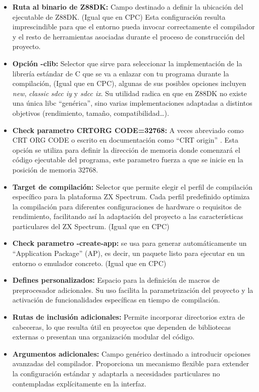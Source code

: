 \documentclass[../main.tex]{subfiles}
\begin{document}
\begin{itemize}
    \item \textbf{Ruta al binario de Z88DK:} Campo destinado a definir la ubicación del ejecutable de Z88DK. (Igual que en CPC) Esta configuración resulta imprescindible para que el entorno pueda invocar correctamente el compilador y el resto de herramientas asociadas durante el proceso de construcción del proyecto.

    \item \textbf{Opción -clib:} Selector que sirve para seleccionar la implementación de la librería estándar de C que se va a enlazar con tu programa durante la compilación, (Igual que en CPC), algunas de sus posibles opciones incluyen \textit{new}, \textit{classic} \textit{sdcc iy} y \textit{sdcc ix}. Su utilidad radica en que en Z88DK no existe una única libc “genérica”, sino varias implementaciones adaptadas a distintos objetivos (rendimiento, tamaño, compatibilidad…).

    \item \textbf{Check parametro CRTORG CODE=32768:} A veces abreviado como CRT ORG CODE o escrito en documentación como ``CRT origin'' \cite{z88dk_crt}. Esta opción se utiliza para definir la dirección de memoria donde comenzará el código ejecutable del programa, este parametro fuerza a que se inicie en la posición de memoria 32768.

    \item \textbf{Target de compilación:} Selector que permite elegir el perfil de compilación específico para la plataforma ZX Spectrum. Cada perfil predefinido optimiza la compilación para diferentes configuraciones de hardware o requisitos de rendimiento, facilitando así la adaptación del proyecto a las características particulares del ZX Spectrum. (Igual que en CPC)

    \item \textbf{Check parametro -create-app:} se usa para generar automáticamente un ``Application Package'' (AP), es decir, un paquete listo para ejecutar en un entorno o emulador concreto. (Igual que en CPC)

    \item \textbf{Defines personalizados:} Espacio para la definición de macros de preprocesador adicionales. Su uso facilita la parametrización del proyecto y la activación de funcionalidades específicas en tiempo de compilación.

    \item \textbf{Rutas de inclusión adicionales:} Permite incorporar directorios extra de cabeceras, lo que resulta útil en proyectos que dependen de bibliotecas externas o presentan una organización modular del código.

    \item \textbf{Argumentos adicionales:} Campo genérico destinado a introducir opciones avanzadas del compilador. Proporciona un mecanismo flexible para extender la configuración estándar y adaptarla a necesidades particulares no contempladas explícitamente en la interfaz.
\end{itemize}
\end{document}
